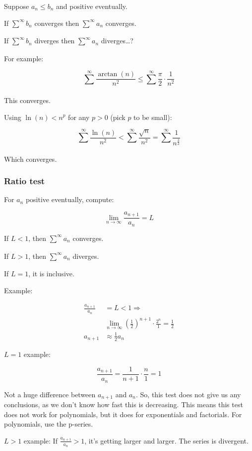 \documentclass[12pt]{article}
\theoremstyle{plain}
\theoremstyle{remark}
\theoremstyle{definition}
\begin{document}
Suppose \(a_{n} \leq b_{n}\) and positive eventually.

If \(\sum_{}^{\infty}b_{n}\) converges then \(\sum_{}^{\infty}a_{n}\)
converges.

If \(\sum_{}^{\infty}b_{n}\) diverges then \(\sum_{}^{\infty}a_{n}\)
diverges\ldots?

For example:

\[\sum_{}^{\infty}\frac{\arctan(n)}{n^{2}} \leq \sum_{}^{\infty}{\frac{\pi}{2} \cdot \frac{1}{n^{2}}}\]

This converges.

Using \(\ln(n) < n^{p}\) for any \(p > 0\) (pick \(p\) to be small):

\[\sum_{}^{\infty}\frac{\ln(n)}{n^{2}} < \sum_{}^{\infty}\frac{\sqrt{n}}{n^{2}} = \sum_{}^{\infty}\frac{1}{n^{\frac{3}{2}}}\]

Which converges.


\subsubsection{Ratio test}

For \(a_{n}\) positive eventually, compute:

\[\lim_{n \rightarrow \infty}\frac{a_{n + 1}}{a_{n}} = L\]

If \(L < 1\), then \(\sum_{}^{\infty}a_{n}\) converges.

If \(L > 1\), then \(\sum_{}^{\infty}a_{n}\) diverges.

If \(L = 1\), it is inclusive.

Example:

\begin{align*}
\frac{a_{n + 1}}{a_{n}} &= L < 1 \Rightarrow  \\
&\lim_{n \rightarrow \infty}{\left( \frac{1}{2} \right)^{n + 1} \cdot \frac{2^{n}}{1} = \frac{1}{2}} \\
a_{n + 1} &\approx \frac{1}{2}a_{n}
\end{align*}


\(L = 1\) example:

\[\frac{a_{n + 1}}{a_{n}} = \frac{1}{n + 1} \cdot \frac{n}{1} = 1\]

Not a huge difference between \(a_{n + 1}\) and \(a_{n}\). So, this test
does not give us any conclusions, as we don't know how fast this is
decreasing. This means this test does not work for polynomials, but it
does for exponentials and factorials. For polynomials, use the p-series.

\(L > 1\) example: If \(\frac{a_{n + 1}}{a_{n}} > 1\), it's getting
larger and larger. The series is divergent.
\end{document}
